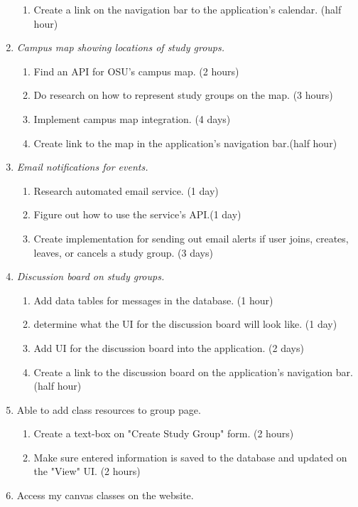 \documentclass[12pt,letterpaper]{article}
\begin{document}
\begin{enumerate}
\begin{enumerate}
    \item Create a link on the navigation bar to the application's calendar. (half hour)
	\end{enumerate}
\item \textit{Campus map showing locations of study groups.}
	\begin{enumerate}
	\item Find an API for OSU's campus map. (2 hours)
    \item Do research on how to represent study groups on the map. (3 hours)
    \item Implement campus map integration. (4 days)
    \item Create link to the map in the application's navigation bar.(half hour)
	\end{enumerate}
\item \textit{Email notifications for events.}
	\begin{enumerate}
	\item Research automated email service. (1 day)
    \item Figure out how to use the service's API.(1 day)
    \item Create implementation for sending out email alerts if user joins, creates, leaves, or cancels a study group. (3 days)
	\end{enumerate}
\item \textit{Discussion board on study groups.}
	\begin{enumerate}
	\item Add data tables for messages in the database. (1 hour)
    \item determine what the UI for the discussion board will look like. (1 day)
    \item Add UI for the discussion board into the application. (2 days)
    \item Create a link to the discussion board on the application's navigation bar. (half hour)
	\end{enumerate}
\item Able to add class resources to group page. 
	\begin{enumerate}
	\item Create a text-box on "Create Study Group" form. (2 hours)
    \item Make sure entered information is saved to the database and updated on the "View" UI. (2 hours)
	\end{enumerate}
\item Access my canvas classes on the website.

\end{enumerate}
\end{document}
